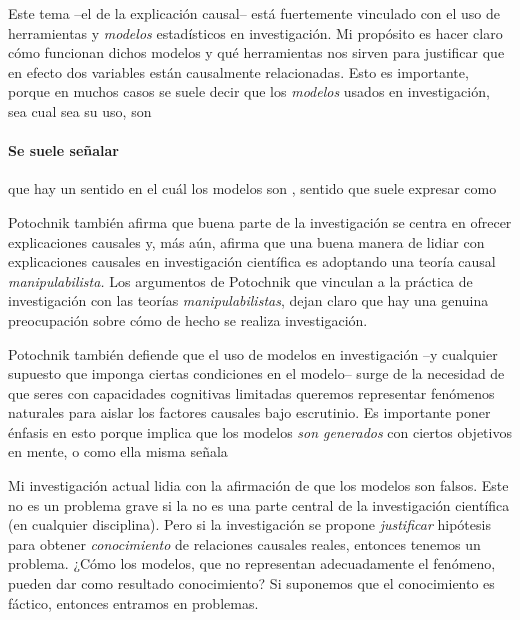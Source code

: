 Este tema --el de la explicación causal-- está fuertemente vinculado con el uso de herramientas y \emph{modelos} estadísticos en investigación.
Mi propósito es hacer claro cómo funcionan dichos modelos y qué herramientas nos sirven para justificar que en efecto dos variables están causalmente relacionadas.
Esto es importante, porque en muchos casos se suele decir que los \emph{modelos} usados en investigación, sea cual sea su uso, son 

\paragraph{Se suele señalar} que hay un sentido en el cuál los modelos son , sentido que suele expresar como  \parencite[p.~18, énfasis agregado]{Potochnik2017-POTIAT-3}

Potochnik también afirma que buena parte de la investigación se centra en ofrecer explicaciones causales y, más aún, afirma que una buena manera de lidiar con explicaciones causales en investigación científica es adoptando una teoría causal \emph{manipulabilista.}
Los argumentos de Potochnik que vinculan a la práctica de investigación con las teorías \emph{manipulabilistas}, dejan claro que hay una genuina preocupación sobre cómo de hecho se realiza investigación.

Potochnik también defiende que el uso de modelos en investigación --y cualquier supuesto que imponga ciertas condiciones en el modelo-- surge de la necesidad de que seres con capacidades cognitivas limitadas queremos representar fenómenos naturales para aislar los factores causales bajo escrutinio.
Es importante poner énfasis en esto porque implica que los modelos \emph{son generados} con ciertos objetivos en mente, o como ella misma señala 

Mi investigación actual lidia con la afirmación de que los modelos son falsos.
Este no es un problema grave si la  no es una parte central de la investigación científica (en cualquier disciplina).
Pero si la investigación se propone \emph{justificar} hipótesis para obtener \emph{conocimiento} de relaciones causales reales, entonces tenemos un problema.
¿Cómo los modelos, que no representan adecuadamente el fenómeno, pueden dar como resultado conocimiento?
Si suponemos que el conocimiento es fáctico, entonces entramos en problemas.

